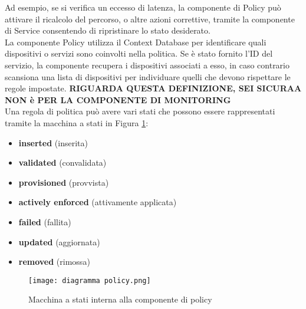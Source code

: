 Ad esempio, se si verifica un eccesso di latenza, la componente di Policy può attivare il ricalcolo del percorso, o altre azioni correttive, tramite la componente di Service
consentendo di ripristinare lo stato desiderato.
\\La componente Policy utilizza il Context Database per identificare quali dispositivi o servizi sono coinvolti nella politica.
Se è stato fornito l'ID del servizio, la componente recupera i dispositivi associati a esso, in caso contrario scansiona una lista di dispositivi per individuare quelli che devono rispettare le regole impostate. \textbf{RIGUARDA QUESTA DEFINIZIONE, SEI SICURAA NON è PER LA COMPONENTE DI MONITORING} 
\\Una regola di politica può avere vari stati che possono essere rappresentati tramite la macchina a stati in Figura \ref{fig:diagramma}:
\begin{itemize}
    \item \textbf{inserted} (inserita)
    \item \textbf{validated} (convalidata)
    \item \textbf{provisioned} (provvista)
    \item \textbf{actively enforced} (attivamente applicata)
    \item \textbf{failed} (fallita)
    \item \textbf{updated} (aggiornata)
    \item \textbf{removed} (rimossa)
\end{itemize}
\begin{figure}[h]
    \centering
   \texttt{[image: diagramma policy.png]}
    \caption{Macchina a stati interna alla componente di policy \cite{D32}}
    \label{fig:diagramma}
\end{figure}

